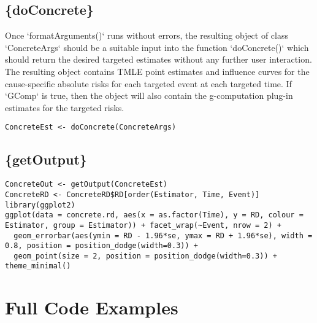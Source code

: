 \documentclass{report}
\newcommand{\1}{\ensuremath{\mathbf{1}}}
\begin{document}
\subsection{\{doConcrete\}}
\label{doConcrete}
Once `formatArguments()` runs without errors, the resulting object of class `ConcreteArgs` should be a suitable input into the function `doConcrete()` which should return the desired targeted estimates without any further user interaction. The resulting object contains TMLE point estimates and influence curves for the cause-specific absolute risks for each targeted event at each targeted time. If `GComp` is true, then the object will also contain the g-computation plug-in estimates for the targeted risks.

\begin{lstlisting}
ConcreteEst <- doConcrete(ConcreteArgs)
\end{lstlisting}

\subsection{\{getOutput\}}
\label{sec:org5060bad}
\begin{lstlisting}
ConcreteOut <- getOutput(ConcreteEst)
ConcreteRD <- ConcreteRD$RD[order(Estimator, Time, Event)]
library(ggplot2)
ggplot(data = concrete.rd, aes(x = as.factor(Time), y = RD, colour = Estimator, group = Estimator)) + facet_wrap(~Event, nrow = 2) + 
  geom_errorbar(aes(ymin = RD - 1.96*se, ymax = RD + 1.96*se), width = 0.8, position = position_dodge(width=0.3)) +
  geom_point(size = 2, position = position_dodge(width=0.3)) + theme_minimal()
\end{lstlisting}

\section{Full Code Examples}
\label{sec:org67c5443}
\end{document}
